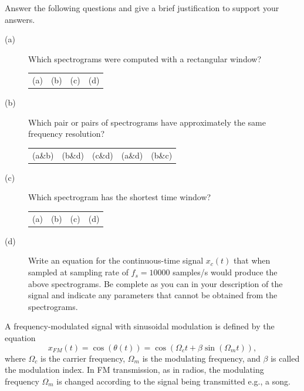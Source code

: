 \documentclass[12pt]{report}
\begin{document}
Answer the following questions and give a brief justification to support your answers. 
\begin{description}
	\item[(a)] Which spectrograms were computed with a rectangular window?
	
	\begin{tabular}{cccc}
		(a) & (b) & (c) & (d)
	\end{tabular}
	
	\item[(b)] Which pair or pairs of spectrograms have approximately the same frequency resolution?
	
	\begin{tabular}{ccccc}
		(a\&b) & (b\&d) & (c\&d) & (a\&d) & (b\&c)
	\end{tabular}
	
	\item[(c)] Which spectrogram has the shortest time window?
	
	\begin{tabular}{cccc}
		(a) & (b) & (c) & (d)
	\end{tabular}
	
	\item[(d)] Write an equation for the continuous-time signal $x_c(t)$ that when sampled at sampling rate of $f_s = 10000$ samples/s would produce the above spectrograms. Be complete as you can in your description of the signal and indicate any parameters that cannot be obtained from the spectrograms.
\end{description}

\newpage
{}
 
A frequency-modulated signal with sinusoidal modulation is defined by the equation
\begin{equation} \label{eq:fm-signal}
	x_{FM}(t) = \cos(\theta(t)) = \cos(\Omega_ct + \beta\sin(\Omega_m t)),
\end{equation}
where $\Omega_c$ is the carrier frequency, $\Omega_m$ is the modulating frequency, and $\beta$ is called the modulation index. In FM transmission, as in radios, the modulating frequency $\Omega_m$ is changed according to the signal being transmitted e.g., a song.
\end{document}
